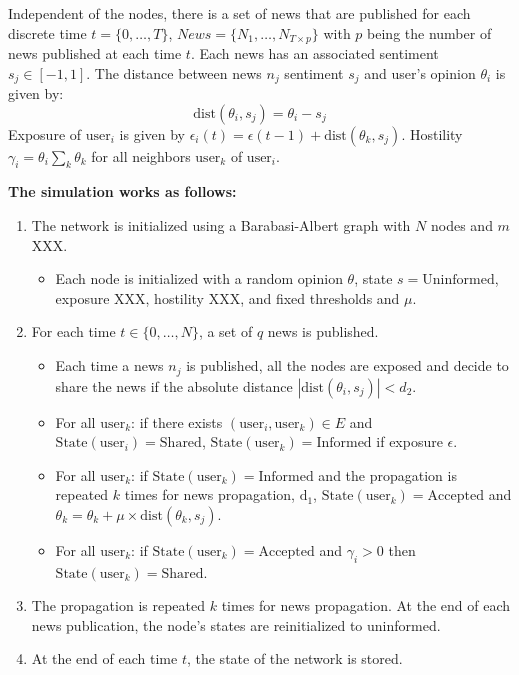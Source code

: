 \documentclass[12pt]{report} %
\begin{document}
Independent of the nodes, there is a set of news that are published for each discrete time $t = \{0, \ldots, T\}$, $News = \{N_1, \ldots, N_{T \times p}\}$ with $p$ being the number of news published at each time $t$. Each news has an associated sentiment $s_j \in [-1, 1]$. The distance between news $n_j$ sentiment $s_j$ and user’s opinion $\theta_i$ is given by:
\begin{equation*}
    \text{dist}(\theta_i, s_j) = \theta_i - s_j
\end{equation*}
Exposure of $\text{user}_i$ is given by $\epsilon_i(t) = \epsilon(t-1) + \text{dist}(\theta_k, s_j)$. Hostility $\gamma_i = \theta_i \sum_k \theta_k$ for all neighbors $\text{user}_k$ of $\text{user}_i$.

\textbf{The simulation works as follows:}

\begin{enumerate}
    \item The network is initialized using a Barabasi-Albert graph \cite{barabasi} with $N$ nodes and $m$ XXX.
        \begin{itemize}
            \item Each node is initialized with a random opinion $\theta$, state $s = \text{Uninformed}$, exposure XXX, hostility XXX, and fixed thresholds and $\mu$.
        \end{itemize}
    \item For each time $t \in \{0, \ldots, N\}$, a set of $q$ news is published.
        \begin{itemize}
            \item Each time a news $n_j$ is published, all the nodes are exposed and decide to share the news if the absolute distance $|\text{dist}(\theta_i, s_j)| < d_2$.
            \item For all $\text{user}_k$: if there exists $(\text{user}_i, \text{user}_k) \in E$ and $\text{State}(\text{user}_i) = \text{Shared}$, $\text{State}(\text{user}_k) = \text{Informed}$ if exposure $\epsilon$.
            \item For all $\text{user}_k$: if $\text{State}(\text{user}_k) = \text{Informed}$ and the propagation is repeated $k$ times for news propagation, $\text{d}_1$, $\text{State}(\text{user}_k) = \text{Accepted}$ and $\theta_k = \theta_k + \mu \times \text{dist}(\theta_k, s_j)$.
            \item For all $\text{user}_k$: if $\text{State}(\text{user}_k) = \text{Accepted}$ and $\gamma_i > 0$ then $\text{State}(\text{user}_k) = \text{Shared}$.
        \end{itemize}
    \item The propagation is repeated $k$ times for news propagation. At the end of each news publication, the node’s states are reinitialized to uninformed.
    \item At the end of each time $t$, the state of the network is stored.
\end{enumerate}
\end{document}
